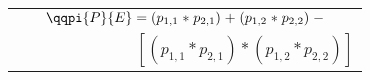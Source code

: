 \scriptsize
\begin{tabular}{@{}c@{}}
$\qqpi{P}{E} = \left( p_{1,1} \mathrel{*} p_{2,1} \right) \mathrel{+} \left( p_{1,2} \mathrel{*} p_{2,2} \right) \mathrel{-}$\\
\ \ \ \ \ \ \ \ \ \ \ \ \ \ \ $[ \left(p_{1,1} \mathrel{*} p_{2,1}\right) \mathrel{*} \left(p_{1,2} \mathrel{*} p_{2,2}\right)]$
\end{tabular}